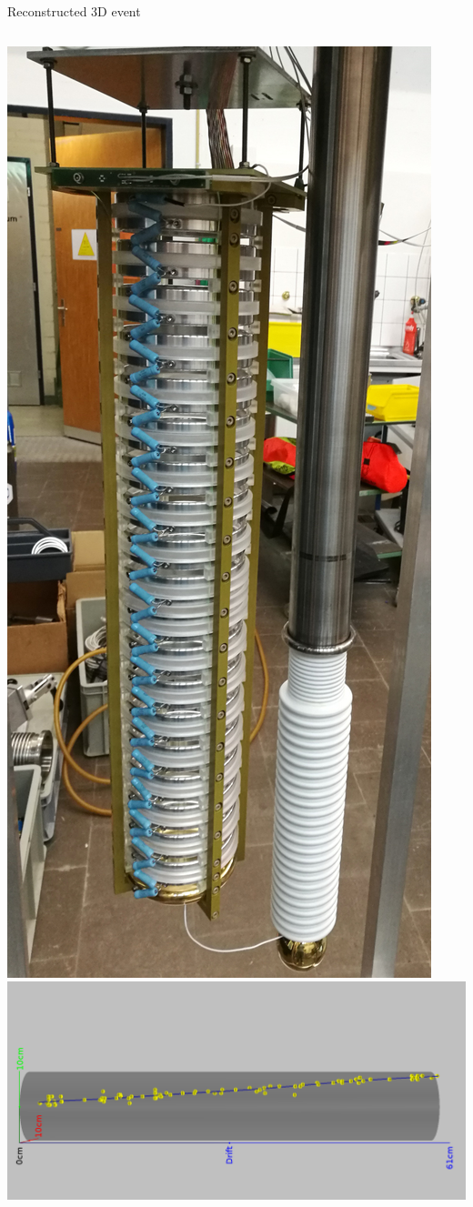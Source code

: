 \documentclass[]{beamer}
\begin{document}
\begin{frame}{Reconstructed 3D event}{}
\begin{columns}[c]
		\includegraphics[height=.8\textheight]{viper/viper_original}
		\centering
		\includegraphics[width=.8\textheight, angle=-90]{defence/event967_kalman}
	\end{columns}
\end{frame}
\end{document}
